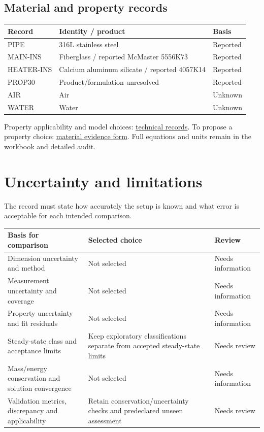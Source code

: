 \documentclass[11pt]{article}
\begin{document}
\subsection*{Material and property records}
\small\setlength{\tabcolsep}{4pt}
\begin{longtable}{>{\raggedright\arraybackslash}p{}>{\raggedright\arraybackslash}p{}>{\raggedright\arraybackslash}p{}}
\toprule
\textbf{Record} & \textbf{Identity / product} & \textbf{Basis} \\\midrule\endhead
PIPE & 316L stainless steel & Reported \\[3pt]
MAIN-INS & Fiberglass / reported McMaster 5556K73 & Reported \\[3pt]
HEATER-INS & Calcium aluminum silicate / reported 4057K14 & Reported \\[3pt]
PROP30 & Product/formulation unresolved & Reported \\[3pt]
AIR & Air & Unknown \\[3pt]
WATER & Water & Unknown \\[3pt]
\bottomrule\end{longtable}\normalsize
\vfill{\small Property applicability and model choices: \hyperref[model-records]{technical records}. To propose a property choice: \hyperref[form-material]{material evidence form}. Full equations and units remain in the workbook and detailed audit.}\par
\clearpage\section{Uncertainty and limitations}\label{uncertainty-main}
The record must state how accurately the setup is known and what error is acceptable for each intended comparison.
\small\setlength{\tabcolsep}{4pt}
\begin{longtable}{>{\raggedright\arraybackslash}p{}>{\raggedright\arraybackslash}p{}>{\raggedright\arraybackslash}p{}}
\toprule
\textbf{Basis for comparison} & \textbf{Selected choice} & \textbf{Review} \\\midrule\endhead
Dimension uncertainty and method & Not selected & Needs information \\[3pt]
Measurement uncertainty and coverage & Not selected & Needs information \\[3pt]
Property uncertainty and fit residuals & Not selected & Needs information \\[3pt]
Steady-state class and acceptance limits & Keep exploratory classifications separate from accepted steady-state limits & Needs review \\[3pt]
Mass/energy conservation and solution convergence & Not selected & Needs information \\[3pt]
Validation metrics, discrepancy and applicability & Retain conservation/uncertainty checks and predeclared unseen assessment & Needs review \\[3pt]
\bottomrule\end{longtable}\normalsize
\end{document}
